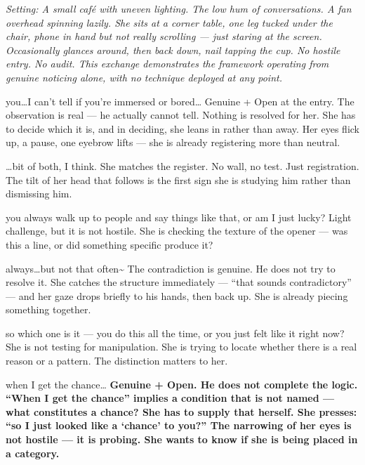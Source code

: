 
\textit{Setting: A small caf\'{e} with uneven lighting. The low hum of conversations. A fan overhead spinning lazily. She sits at a corner table, one leg tucked under the chair, phone in hand but not really scrolling --- just staring at the screen. Occasionally glances around, then back down, nail tapping the cup. No hostile entry. No audit. This exchange demonstrates the framework operating from genuine noticing alone, with no technique deployed at any point.}

\goldrule

{you\ldots I can't tell if you're immersed or bored\ldots}
{Genuine + Open at the entry. The observation is real --- he actually cannot tell. Nothing is resolved for her. She has to decide which it is, and in deciding, she leans in rather than away. Her eyes flick up, a pause, one eyebrow lifts --- she is already registering more than neutral.}

{\ldots bit of both, I think.}
{She matches the register. No wall, no test. Just registration. The tilt of her head that follows is the first sign she is studying him rather than dismissing him.}

\thinrule

{you always walk up to people and say things like that, or am I just lucky?}
{Light challenge, but it is not hostile. She is checking the texture of the opener --- was this a line, or did something specific produce it?}

{always\ldots but not that often\textasciitilde}
{The contradiction is genuine. He does not try to resolve it. She catches the structure immediately --- ``that sounds contradictory'' --- and her gaze drops briefly to his hands, then back up. She is already piecing something together.}

\thinrule

{so which one is it --- you do this all the time, or you just felt like it right now?}
{She is not testing for manipulation. She is trying to locate whether there is a real reason or a pattern. The distinction matters to her.}

{when I get the chance\ldots}
{\textbf{Genuine + Open. He does not complete the logic. ``When I get the chance'' implies a condition that is not named --- what constitutes a chance? She has to supply that herself. She presses: ``so I just looked like a `chance' to you?'' The narrowing of her eyes is not hostile --- it is probing. She wants to know if she is being placed in a category.}}

